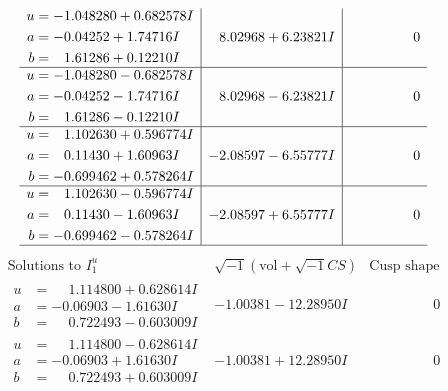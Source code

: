 \documentclass[1p]{elsarticle_modified}
\theoremstyle{definition}
\newcommand{\I}{\sqrt{-1}}
\begin{document}
$$\begin{array}{c|c|c}
\begin{aligned}
u &= -1.048280 + 0.682578 I \\
a &= -0.04252 + 1.74716 I \\
b &= \phantom{-}1.61286 + 0.12210 I\end{aligned}
 & \phantom{-}8.02968 + 6.23821 I & \phantom{-0.000000 } 0 \\ \hline\begin{aligned}
u &= -1.048280 - 0.682578 I \\
a &= -0.04252 - 1.74716 I \\
b &= \phantom{-}1.61286 - 0.12210 I\end{aligned}
 & \phantom{-}8.02968 - 6.23821 I & \phantom{-0.000000 } 0 \\ \hline\begin{aligned}
u &= \phantom{-}1.102630 + 0.596774 I \\
a &= \phantom{-}0.11430 + 1.60963 I \\
b &= -0.699462 + 0.578264 I\end{aligned}
 & -2.08597 - 6.55777 I & \phantom{-0.000000 } 0 \\ \hline\begin{aligned}
u &= \phantom{-}1.102630 - 0.596774 I \\
a &= \phantom{-}0.11430 - 1.60963 I \\
b &= -0.699462 - 0.578264 I\end{aligned}
 & -2.08597 + 6.55777 I & \phantom{-0.000000 } 0\\
 \hline 
 \end{array}$$\newpage$$\begin{array}{c|c|c}  
\text{Solutions to }I^u_{1}& \I (\text{vol} + \sqrt{-1}CS) & \text{Cusp shape}\\
 \hline 
\begin{aligned}
u &= \phantom{-}1.114800 + 0.628614 I \\
a &= -0.06903 - 1.61630 I \\
b &= \phantom{-}0.722493 - 0.603009 I\end{aligned}
 & -1.00381 - 12.28950 I & \phantom{-0.000000 } 0 \\ \hline\begin{aligned}
u &= \phantom{-}1.114800 - 0.628614 I \\
a &= -0.06903 + 1.61630 I \\
b &= \phantom{-}0.722493 + 0.603009 I\end{aligned}
 & -1.00381 + 12.28950 I & \phantom{-0.000000 } 0 \\ \hline\begin{aligned}

\end{aligned}
\end{array}$$
\end{document}
